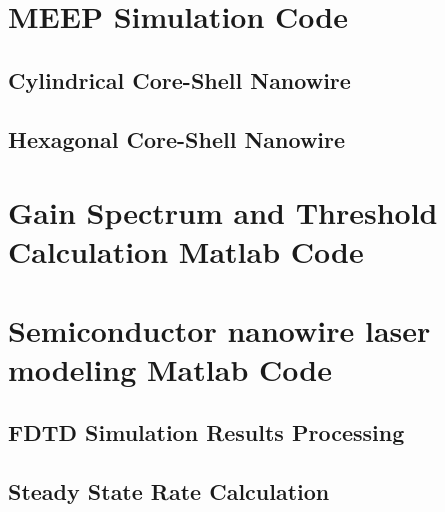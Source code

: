 \chapter{MEEP Simulation Code} \label{ch:meepcode} 
\section{Cylindrical Core-Shell Nanowire}



\section{Hexagonal Core-Shell Nanowire}


\chapter{Gain Spectrum and Threshold Calculation Matlab Code} \label{ch:matlabcode} 


\chapter[NW Lasing Modeling]{Semiconductor nanowire laser modeling Matlab Code} \label{ch:NWLaserMcode} 
\section{FDTD Simulation Results Processing}

\section{Steady State Rate Calculation}


